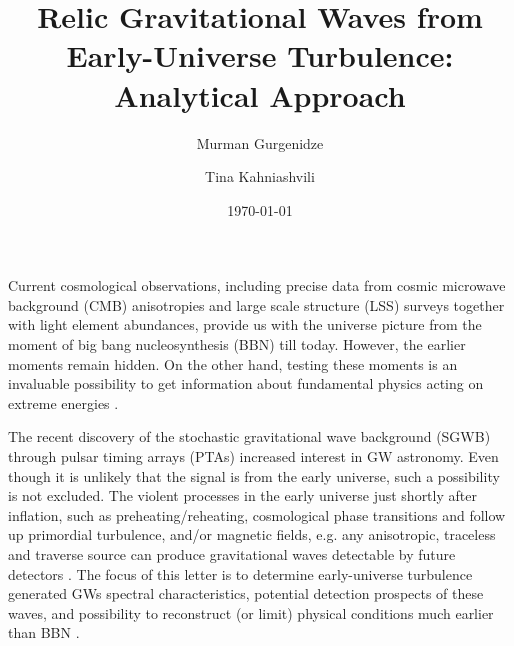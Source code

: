 \documentclass[prd,twocolumn,aps,psfig,nobibnotes,superscriptaddress,preprintnumbers,times]{revtex4}
\begin{document}
\title{Relic Gravitational Waves from Early-Universe Turbulence: Analytical Approach}
\date{\today}



\author{Murman Gurgenidze}

\author{Tina Kahniashvili}

\begin{abstract}

\end{abstract}

\maketitle


Current cosmological observations, including  precise data from cosmic microwave background (CMB) anisotropies and large scale structure (LSS) surveys together with light element abundances, provide us with the universe picture from the moment of big bang nucleosynthesis (BBN) till today. However,  the earlier moments remain hidden. On the other hand, testing these moments is an invaluable possibility to get information about fundamental physics acting on extreme energies
\cite{Planck:2018vyg,Fields:2019pfx,Maggiore:1999vm,Dent:2024bhi,Roshan:2024qnv}.

The recent discovery of the stochastic gravitational wave background (SGWB) through pulsar timing arrays (PTAs) increased  interest in GW astronomy. Even though it is unlikely that the signal is from the early universe, such a possibility is not excluded. The violent processes in the early universe just shortly after inflation, such as preheating/reheating, cosmological phase transitions and follow up primordial turbulence, and/or magnetic fields, e.g. any anisotropic, traceless and traverse source can produce gravitational waves detectable by future detectors
\cite{NANOGrav:2023gor,RoperPol:2022iel,Khlebnikov:1997di,Caprini:2018mtu}.
The focus of this letter is to determine early-universe turbulence generated GWs spectral characteristics, potential detection prospects of these waves, and possibility to reconstruct (or limit) physical conditions much earlier than BBN
\cite{Kosowsky:2001xp,Gogoberidze:2007an,Caprini:2019egz}.
\end{document}

